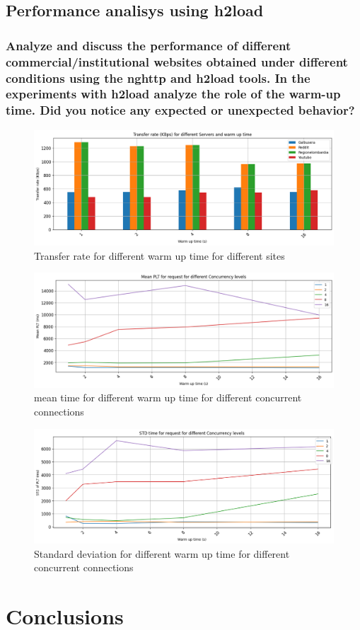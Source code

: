 \documentclass[eng]{class}
\begin{document}
\subsection{Performance analisys using h2load}
\subsubsection*{Analyze and discuss the performance of different commercial/institutional websites obtained
  under different conditions using the nghttp and h2load tools. In the experiments with
  h2load analyze the role of the warm-up time. Did you notice any expected or unexpected
  behavior?}

\begin{figure}[H]
  \centering
  \includegraphics[width=\columnwidth]{images/transf_rate_diff_warm_up.png}
  \caption{Transfer rate for different warm up time for different sites}
  \label{fig-6}
\end{figure}

\begin{figure}[H]
  \centering
  \includegraphics[width=\columnwidth]{images/mean_time_warm_up.png}
  \caption{mean time for different warm up time for different concurrent connections}
  \label{fig-7}
\end{figure}

\begin{figure}[H]
  \centering
  \includegraphics[width=\columnwidth]{images/var_warm_up.png}
  \caption{Standard deviation for different warm up time for different concurrent connections}
  \label{fig-8}
\end{figure}

\section{Conclusions}
\end{document}
